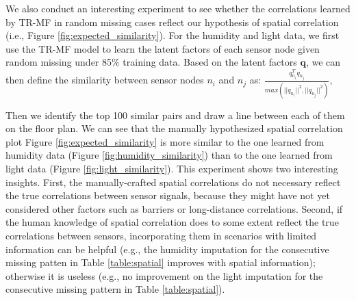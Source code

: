 We also conduct an interesting experiment to see whether the correlations learned by TR-MF in random missing cases reflect our hypothesis of spatial correlation (i.e., Figure \ref{fig:expected_similarity}).
For the humidity and light data, we first use the TR-MF model to learn the latent factors of each sensor node given random missing under 85\% training data.
Based on the latent factors $\mathbf{q}$, we can then define the similarity between sensor nodes $n_i$ and $n_j$ as:
$\frac{q_{n_i}^T q_{n_j}}{max(||q_{n_i}||^2, ||q_{n_j}||^2)},$

Then we identify the top 100 similar pairs and draw a line between each of them on the floor plan.
We can see that the manually hypothesized spatial correlation plot Figure \ref{fig:expected_similarity} is more similar to the one learned from humidity data (Figure \ref{fig:humidity_similarity}) than to the one learned from light data (Figure \ref{fig:light_similarity}).
This experiment shows two interesting insights.
First, the manually-crafted spatial correlations do not necessary reflect the true correlations between sensor signals, because they might have not yet considered other factors such as barriers or long-distance correlations. 
Second, if the human knowledge of spatial correlation does to some extent reflect the true correlations between sensors, incorporating them in scenarios with limited information can be helpful (e.g., the humidity imputation for the consecutive missing patten in Table \ref{table:spatial} improves with spatial information); otherwise it is useless (e.g., no improvement on the light imputation for the consecutive missing pattern in Table \ref{table:spatial}).
